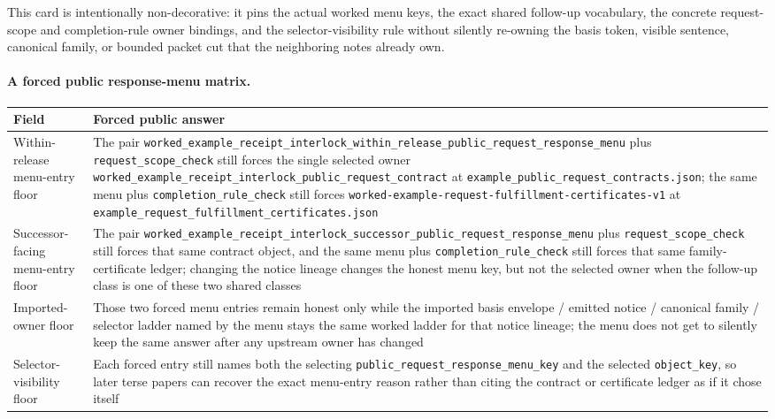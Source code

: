 \documentclass[11pt]{article}
\begin{document}
This card is intentionally non-decorative: it pins the actual worked menu keys, the exact shared follow-up vocabulary, the concrete request-scope and completion-rule owner bindings, and the selector-visibility rule without silently re-owning the basis token, visible sentence, canonical family, or bounded packet cut that the neighboring notes already own.\cite{series:workedexample}

\paragraph{A forced public response-menu matrix.}
\begin{table}[t]
\centering
\small
\begin{tabularx}{\linewidth}{@{}lX@{}}
\toprule
Field & Forced public answer \\
\midrule
Within-release menu-entry floor & The pair \nolinkurl{worked_example_receipt_interlock_within_release_public_request_response_menu} plus \nolinkurl{request_scope_check} still forces the single selected owner \nolinkurl{worked_example_receipt_interlock_public_request_contract} at \nolinkurl{example_public_request_contracts.json}; the same menu plus \nolinkurl{completion_rule_check} still forces \nolinkurl{worked-example-request-fulfillment-certificates-v1} at \nolinkurl{example_request_fulfillment_certificates.json} \\
Successor-facing menu-entry floor & The pair \nolinkurl{worked_example_receipt_interlock_successor_public_request_response_menu} plus \nolinkurl{request_scope_check} still forces that same contract object, and the same menu plus \nolinkurl{completion_rule_check} still forces that same family-certificate ledger; changing the notice lineage changes the honest menu key, but not the selected owner when the follow-up class is one of these two shared classes \\
Imported-owner floor & Those two forced menu entries remain honest only while the imported basis envelope / emitted notice / canonical family / selector ladder named by the menu stays the same worked ladder for that notice lineage; the menu does not get to silently keep the same answer after any upstream owner has changed \\
Selector-visibility floor & Each forced entry still names both the selecting \nolinkurl{public_request_response_menu_key} and the selected \nolinkurl{object_key}, so later terse papers can recover the exact menu-entry reason rather than citing the contract or certificate ledger as if it chose itself \\

\end{tabularx}
\end{table}
\end{document}
